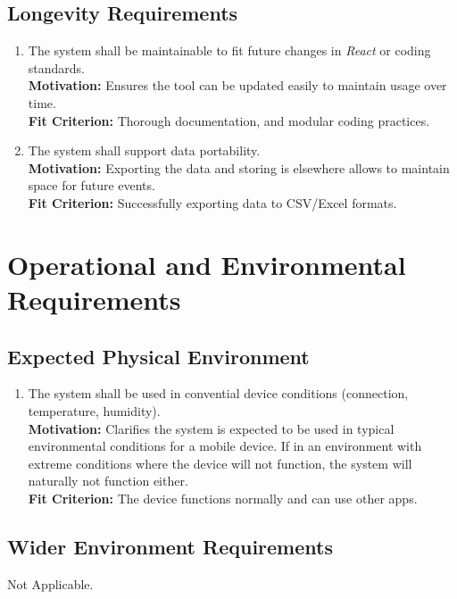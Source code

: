 \documentclass[12pt]{article}
\begin{document}
\subsection{Longevity Requirements}
\begin{enumerate}[label=\bfseries LG-\arabic*:, wide=0pt, leftmargin=*]
  \item The system shall be maintainable to fit future changes in \textit{React} or coding standards.\\
    {\bf Motivation:} Ensures the tool can be updated easily to maintain usage over time.\\
    {\bf Fit Criterion:} Thorough documentation, and modular coding practices.
  \item The system shall support data portability.\\
    {\bf Motivation:} Exporting the data and storing is elsewhere allows to maintain space for future events.\\
    {\bf Fit Criterion:} Successfully exporting data to CSV/Excel formats.
\end{enumerate}

\section{Operational and Environmental Requirements}
\subsection{Expected Physical Environment}
\begin{enumerate}[label=\bfseries PE-\arabic*:, wide=0pt, leftmargin=*]
  \item The system shall be used in convential device conditions (connection, temperature, humidity).\\
    {\bf Motivation:} Clarifies the system is expected to be used in typical environmental conditions for a mobile device. If in an environment with extreme conditions where the device will not function, the system will naturally not function either.\\
    {\bf Fit Criterion:} The device functions normally and can use other apps.
\end{enumerate}

\subsection{Wider Environment Requirements}
Not Applicable.
\end{document}
